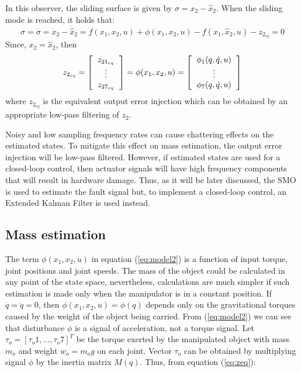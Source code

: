 \documentclass[conference,letterpaper]{ieeeconf}
\begin{document}
In this observer, the sliding surface is given by $\sigma = x_2 - \hat{x}_2$. When the sliding mode is reached, it holds that:
\[\sigma = \dot{\sigma} = \dot{x}_2 - \dot{\hat{x}}_2 = f(x_1, x_2, u) + \phi(x_1, x_2, u) - f(x_1, \hat{x}_2, u) - z_{2_{eq}} = 0\]
Since,  $x_2 = \hat{x}_2$, then
\begin{equation}
  z_{2_{eq}} = \left[\begin{tabular}{c}
      $z_{21_{eq}}$\\
      $\vdots$\\
      $z_{27_{eq}}$
    \end{tabular}\right] = \phi(x_1, x_2, u) =
  \left[\begin{tabular}{c}
      $\phi_1(q, \dot{q}, u)$\\
      $\vdots$\\
      $\phi_7(q, \dot{q}, u)$
    \end{tabular}\right]
  \label{eq:zeq}
\end{equation}
where $z_{2_{eq}}$ is the equivalent output error injection which can be obtained by an appropriate low-pass filtering of $z_2$.

Noisy and low sampling frequency rates can cause chattering effects on the estimated states. To mitigate this effect on mass estimation, the output error injection will be low-pass filtered. However, if estimated states are used for a closed-loop control, then actuator signals will have high frequency components that will result in hardware damage. Thus, as it will be later discussed, the SMO is used to estimate the fault signal but, to implement a closed-loop control, an Extended Kalman Filter is used instead. 

\subsection{Mass estimation}
\label{sec:MassEstimation}
The term $\phi(x_1, x_2, u)$ in equation (\ref{eq:model2}) is a function of input torque, joint positions and joint speeds. The mass of the object could be calculated in any point of the state space, nevertheless, calculations are much simpler if such estimation is made only when the manipulator is in a constant position. If $\dot{q}= \ddot{q} = 0$, then $\phi(x_1, x_2, u) = \phi(q)$ depends only on the gravitational torques caused by the weight of the object being carried. From (\ref{eq:model2}) we can see that disturbance $\phi$ is a signal of acceleration, not a torque signal. Let $\tau_o = [\tau_o1,\dots,\tau_o7]^T$ be the torque exerted by the manipulated object with mass $m_o$ and weight $w_o=m_o g$ on each joint. Vector $\tau_o$ can be obtained by multiplying signal $\phi$ by the inertia matrix $M(q)$. Thus, from equation (\ref{eq:zeq}):
\end{document}
